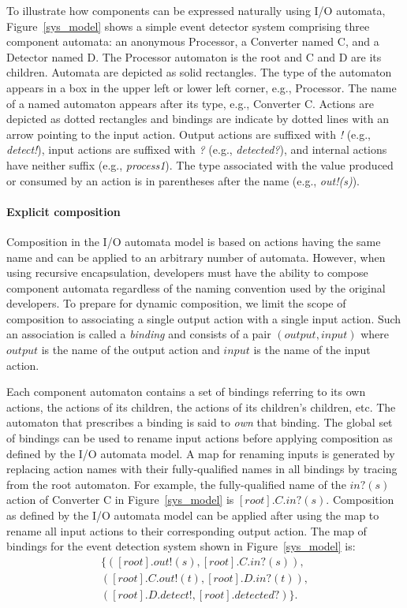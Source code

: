 To illustrate how components can be expressed naturally using I/O automata, Figure~\ref{sys_model} shows a simple event detector system comprising three component automata: an anonymous Processor, a Converter named C, and a Detector named D. 
The Processor automaton is the root and C and D are its children.
Automata are depicted as solid rectangles. The type of the automaton appears in a box in the upper left or lower left corner, e.g., Processor.
The name of a named automaton appears after its type, e.g., Converter C.
Actions are depicted as dotted rectangles and bindings are indicate by dotted lines with an arrow pointing to the input action.
Output actions are suffixed with \emph{!} (e.g., \emph{detect!}), input actions are suffixed with \emph{?} (e.g., \emph{detected?}), and internal actions have neither suffix (e.g., \emph{process1}).
The type associated with the value produced or consumed by an action is in parentheses after the name (e.g., \emph{out!(s)}).

\paragraph*{Explicit composition}
Composition in the I/O automata model is based on actions having the same name and can be applied to an arbitrary number of automata.
However, when using recursive encapsulation, developers must have the ability to compose component automata regardless of the naming convention used by the original developers.
To prepare for dynamic composition, we limit the scope of composition to associating a single output action with a single input action.
Such an association is called a \emph{binding} and consists of a pair $(output, input)$ where $output$ is the name of the output action and $input$ is the name of the input action.

Each component automaton contains a set of bindings referring to its own actions, the actions of its children, the actions of its children's children, etc.
The automaton that prescribes a binding is said to \emph{own} that binding.
The global set of bindings can be used to rename input actions before applying composition as defined by the I/O automata model.
A map for renaming inputs is generated by replacing action names with their fully-qualified names in all bindings by tracing from the root automaton.
For example, the fully-qualified name of the $in?(s)$ action of Converter C in Figure~\ref{sys_model} is $[root].C.in?(s)$.
Composition as defined by the I/O automata model can be applied after using the map to rename all input actions to their corresponding output action.
The map of bindings for the event detection system shown in Figure~\ref{sys_model} is: 
\begin{displaymath}
\begin{split}
\{ ([root].out!(s), [root].C.in?(s)),\\
   ([root].C.out!(t), [root].D.in?(t)),\\
   ([root].D.detect!, [root].detected?) \}.
\end{split}
\end{displaymath}

